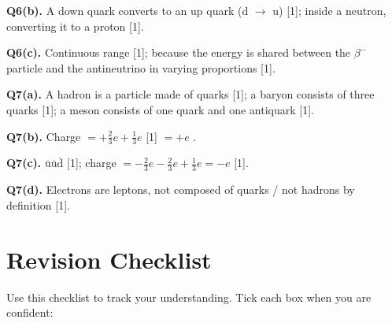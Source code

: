 \begin{markscheme}
\vspace{0.5em}\textbf{Q6(b).} A down quark converts to an up quark (d $\to$ u) [1]; inside a neutron, converting it to a proton [1].

\vspace{0.5em}\textbf{Q6(c).} Continuous range [1]; because the energy is shared between the $\beta^-$ particle and the antineutrino in varying proportions [1].

\vspace{0.5em}\textbf{Q7(a).} A hadron is a particle made of quarks [1]; a baryon consists of three quarks [1]; a meson consists of one quark and one antiquark [1].

\vspace{0.5em}\textbf{Q7(b).} Charge $= +\tfrac{2}{3}e + \tfrac{1}{3}e$ [1] $= +e$ \checkmark [1].

\vspace{0.5em}\textbf{Q7(c).} $\bar{\text{u}}\bar{\text{u}}\bar{\text{d}}$ [1]; charge $= -\tfrac{2}{3}e - \tfrac{2}{3}e + \tfrac{1}{3}e = -e$ [1].

\vspace{0.5em}\textbf{Q7(d).} Electrons are leptons, not composed of quarks / not hadrons by definition [1].

\end{markscheme}

\newpage
\section{Revision Checklist}

Use this checklist to track your understanding. Tick each box when you are confident:

